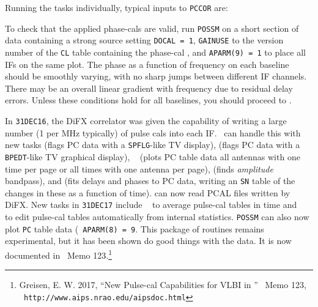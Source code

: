 Running the tasks individually, typical inputs to {\tt PCCOR} are:

To check that the applied phase-cals are valid, run {\tt POSSM} on a
short section of data containing a strong source setting {\tt DOCAL =
1}, {\tt GAINUSE} to the version number of the {\tt CL} table
containing the phase-cal , and {\tt APARM(9) = 1} to
place all IFs on the same plot.  The phase as a function of frequency
on each baseline should be smoothly varying, with no sharp jumps
between different IF channels.  There may be an overall linear
gradient with frequency due to residual delay errors.  Unless these
conditions hold for all baselines, you should proceed to
.

In {\tt 31DEC16}, the DiFX correlator was given the capability of
writing a large number (1 per MHz typically) of pulse cals into each
IF\@.  \AIPS\ can handle this with new tasks {\tt {}} (flags
PC data with a {\tt SPFLG}-like TV display), {\tt {}} (flags
PC data with a {\tt BPEDT}-like TV graphical display), {\tt
{}} (plots PC table data all antennas with one time per page
or all times with one antenna per page), {\tt {}} (finds
{\it amplitude} bandpass), and {\tt {}} (fits delays and
phases to PC data, writing an {\tt SN} table of the changes in these
as a function of time).  {\tt {}} can now read PCAL files
written by DiFX\@.  New tasks in {\tt 31DEC17} include {\tt
{}} to average pulse-cal tables in time and {\tt
{}} to edit pulse-cal tables automatically from internal
statistics.  {\tt POSSM} can also now plot {\tt PC} table data ({\tt
APARM(8) = 9}.  This package of routines remains experimental, but it
has been shown do good things with the data.  It is now documented in
\AIPS\ Memo 123.\footnote{Greisen, E. W. 2017, ``New Pulse-cal
Capabilities for VLBI in \AIPS'' \AIPS\ Memo 123,\\  {\tt
http://www.aips.nrao.edu/aipsdoc.html}}

